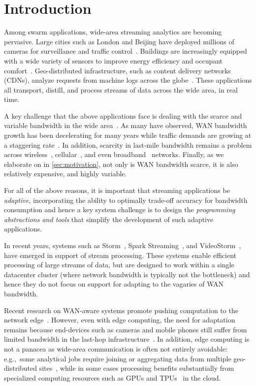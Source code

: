 \section{Introduction}

Among swarm applications, wide-area streaming analytics are becoming
pervasive. Large cities such as London and Beijing have deployed millions of
cameras for surveillance and traffic control~\cite{skynet,
  london.surveillance}. Buildings are increasingly equipped with a wide variety
of sensors to improve energy efficiency and occupant
comfort~\cite{krioukov2012building}. Geo-distributed infrastructure, such as
content delivery networks (CDNs), analyze requests from machine logs across the
globe~\cite{mukerjee2015practical}. These applications all transport, distill,
and process streams of data across the wide area, in real time.

A key challenge that the above applications face is dealing with the scarce and
variable bandwidth in the wide area~\cite{hsieh17gaia, vulimiri2015global}.  As
many have observed, WAN bandwidth growth has been decelerating for many years
while traffic demands are growing at a staggering
rate~\cite{global2016telegeography, cisco2013zettabyte, cisco2016global}.  In
addition, scarcity in last-mile bandwidth remains a problem across
wireless~\cite{biswas2015large}, cellular~\cite{nikravesh2014mobile}, and even
broadband~\cite{grover2013peeking, sundaresan2014bismark} networks.  Finally, as
we elaborate on in \autoref{sec:motivation}, not only is WAN bandwidth scarce,
it is also relatively expensive, and highly variable.

For all of the above reasons, it is important that streaming applications be
\emph{adaptive}, incorporating the ability to optimally trade-off accuracy for
bandwidth consumption and hence a key system challenge is to design the
\emph{programming abstractions and tools} that simplify the development of such
adaptive applications.

In recent years, systems such as Storm~\cite{toshniwal2014storm}, Spark
Streaming~\cite{zaharia2013discretized}, and VideoStorm~\cite{zhang2017live},
have emerged in support of stream processing.  These systems enable efficient
processing of large streams of data, but are designed to work within a single
datacenter cluster (where network bandwidth is typically not the bottleneck) and
hence they do not focus on support for adapting to the vagaries of WAN
bandwidth.

Recent research on WAN-aware systems promote pushing computation to the network
edge~\cite{rabkin2014aggregation, satyanarayanan2009case}.  However, even with
edge computing, the need for adaptation remains because end-devices such as
cameras and mobile phones still suffer from limited bandwidth in the last-hop
infrastructure~\cite{abari2017enabling, zhang2015design}.  In addition, edge
computing is not a panacea as wide-area communication is often not entirely
avoidable: e.g.,~some analytical jobs require joining or aggregating data from
multiple geo-distributed sites~\cite{pu2015low, viswanathan2016clarinet}, while
in some cases processing benefits substantially from specialized computing
resources such as GPUs and TPUs~\cite{abadi2016tensorflow} in the cloud.

